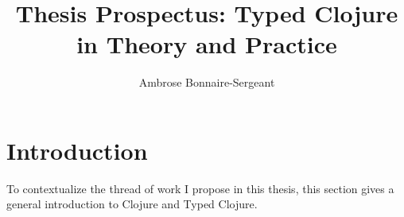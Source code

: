 \documentclass[9pt]{extarticle}
\title{Thesis Prospectus: Typed Clojure in Theory and Practice}
\author{Ambrose Bonnaire-Sergeant}
\begin{document}
\maketitle

\begin{abstract}
  
\end{abstract}

\section{Introduction}

To contextualize the thread of work I propose in this thesis, this section
gives a general introduction to Clojure and Typed Clojure.





\printbibliography
\end{document}
